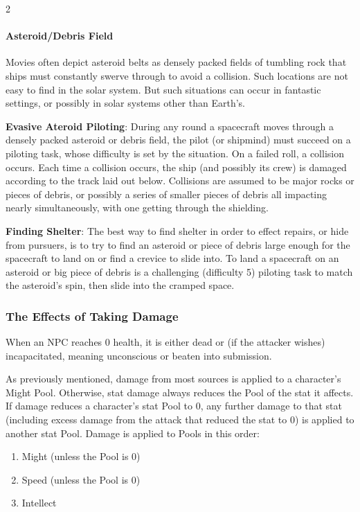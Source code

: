 \begin{multicols}{2}
\paragraph{Asteroid/Debris Field}

Movies often depict asteroid belts as densely packed fields of tumbling rock that ships must constantly swerve through to avoid a collision. Such locations are not easy to find in the solar system. But such situations can occur in fantastic settings, or possibly in solar systems other than Earth’s. 

\textbf{Evasive Ateroid Piloting}: During any round a spacecraft moves through a densely packed asteroid or debris field, the pilot (or shipmind) must succeed on a piloting task, whose difficulty is set by the situation. On a failed roll, a collision occurs. Each time a collision occurs, the ship (and possibly its crew) is damaged according to the track laid out below. Collisions are assumed to be major rocks or pieces of debris, or possibly a series of smaller pieces of debris all impacting nearly simultaneously, with one getting through the shielding.
	
\textbf{Finding Shelter}: The best way to find shelter in order to effect repairs, or hide from pursuers, is to try to find an asteroid or piece of debris large enough for the spacecraft to land on or find a crevice to slide into. To land a spacecraft on an asteroid or big piece of debris is a challenging (difficulty 5) piloting task to match the asteroid’s spin, then slide into the cramped space.

\subsubsection{The Effects of Taking Damage}

When an NPC reaches 0 health, it is either dead or (if the attacker wishes) incapacitated, meaning unconscious or beaten into submission.

As previously mentioned, damage from most sources is applied to a character’s Might Pool. Otherwise, stat damage always reduces the Pool of the stat it affects.
If damage reduces a character’s stat Pool to 0, any further damage to that stat (including excess damage from the attack that reduced the stat to 0) is applied to another stat Pool. Damage is applied to Pools in this order:

\begin{enumerate} 
\item Might (unless the Pool is 0)
\item Speed (unless the Pool is 0)
\item Intellect
\end{enumerate}


\end{multicols}

